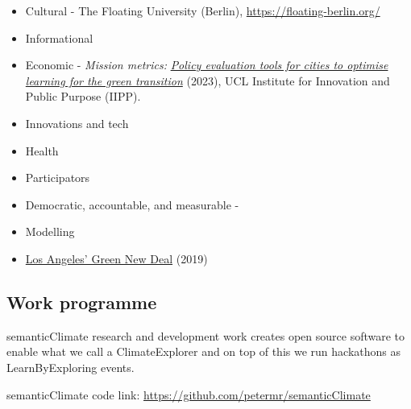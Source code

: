 \documentclass{article}
\begin{document}
\begin{itemize}
\item Cultural  - The Floating University (Berlin), \href{https://floating-berlin.org/}{https://floating-berlin.org/}


\item Informational


\item Economic - \emph{Mission metrics: }\emph{\href{https://www.ucl.ac.uk/bartlett/public-purpose/publications/2023/feb/mission-metrics-policy-evaluation-tools-cities-optimise-learning-green}{Policy evaluation tools for cities to optimise learning for the green transition}} (2023), UCL Institute for Innovation and Public Purpose (IIPP).


\item Innovations and tech


\item Health


\item Participators


\item Democratic, accountable, and measurable - 


\item Modelling


\end{itemize}
\begin{itemize}
\item \href{https://plan.lamayor.org/}{Los Angeles’ Green New Deal} (2019)


\end{itemize}

\subsection{Work programme}\label{H9711914}



semanticClimate research and development work creates open source software to enable what we call a ClimateExplorer and on top of this we run hackathons as LearnByExploring events.


semanticClimate code link: \href{https://github.com/petermr/semanticClimate}{https://github.com/petermr/semanticClimate} 
\end{document}

